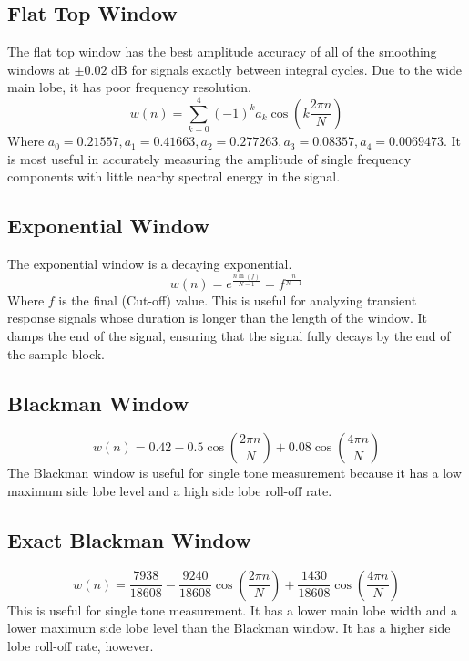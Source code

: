 \documentclass[oneside]{book}
\theoremstyle{mystyle}
\begin{document}
\subsection{Flat Top Window}
\noindent The flat top window has the best amplitude accuracy of all of the smoothing windows at $\pm 0.02$ dB for signals exactly between integral cycles. Due to the wide main lobe, it has poor frequency resolution. 
\begin{equation}
w(n) = \sum_{k=0}^{4} (-1)^{k}a_{k}\cos(k\frac{2\pi n}{N})
\end{equation}
\noindent Where $a_{0} = 0.21557, a_{1} = 0.41663, a_{2} = 0.277263, a_{3} = 0.08357, a_{4} = 0.0069473$. It is most useful in accurately measuring the amplitude of single frequency components with little nearby spectral energy in the signal.
\subsection{Exponential Window}
The exponential window is a decaying exponential.
\begin{equation}
w(n) = e^{\frac{n\ln(f)}{N-1}} = f^{\frac{n}{N-1}}
\end{equation}
\noindent Where $f$ is the final (Cut-off) value. This is useful for analyzing transient response signals whose duration is longer than the length of the window. It damps the end of the signal, ensuring that the signal fully decays by the end of the sample block. 
\subsection{Blackman Window}
\begin{equation}
w(n) = 0.42 - 0.5\cos(\frac{2\pi n}{N}) + 0.08\cos(\frac{4 \pi n}{N})
\end{equation}
\noindent The Blackman window is useful for single tone measurement because it has a low maximum side lobe level and a high side lobe roll-off rate.
\subsection{Exact Blackman Window}
\begin{equation}
w(n) = \frac{7938}{18608} - \frac{9240}{18608}\cos(\frac{2\pi n}{N}) + \frac{1430}{18608}\cos(\frac{4\pi n}{N})
\end{equation}
\noindent This is useful for single tone measurement. It has a lower main lobe width and a lower maximum side lobe level than the Blackman window. It has a higher side lobe roll-off rate, however.
\end{document}
